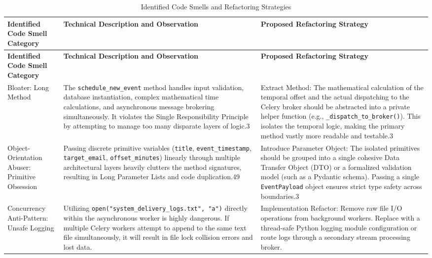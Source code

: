 \renewcommand{\arraystretch}{1.3}
\begin{longtable}{|>{\raggedright\arraybackslash}p{}|>{\raggedright\arraybackslash}p{}|>{\raggedright\arraybackslash}p{}|}
	\caption{Identified Code Smells and Refactoring Strategies}\label{tab:identified-code-smells-refactoring} \\
	\hline
	\textbf{Identified Code Smell Category} & \textbf{Technical Description and Observation} & \textbf{Proposed Refactoring Strategy} \\
	\hline
	\endfirsthead

	\hline
	\textbf{Identified Code Smell Category} & \textbf{Technical Description and Observation} & \textbf{Proposed Refactoring Strategy} \\
	\hline
	\endhead

	\hline
	\endfoot

	\hline
	\endlastfoot

	Bloater: Long Method &
	The \texttt{schedule\_new\_event} method handles input validation, database instantiation, complex mathematical time calculations, and asynchronous message brokering simultaneously. It violates the Single Responsibility Principle by attempting to manage too many disparate layers of logic.3 &
	Extract Method: The mathematical calculation of the temporal offset and the actual dispatching to the Celery broker should be abstracted into a private helper function (e.g., \texttt{\_dispatch\_to\_broker()}). This isolates the temporal logic, making the primary method vastly more readable and testable.3 \\
	\hline
	Object-Orientation Abuser: Primitive Obsession &
	Passing discrete primitive variables (\texttt{title}, \texttt{event\_timestamp}, \texttt{target\_email}, \texttt{offset\_minutes}) linearly through multiple architectural layers heavily clutters the method signatures, resulting in Long Parameter Lists and code duplication.49 &
	Introduce Parameter Object: The isolated primitives should be grouped into a single cohesive Data Transfer Object (DTO) or a formalized validation model (such as a Pydantic schema). Passing a single \texttt{EventPayload} object ensures strict type safety across boundaries.3 \\
	\hline
	Concurrency Anti-Pattern: Unsafe Logging &
	Utilizing \texttt{open("system\_delivery\_logs.txt", "a")} directly within the asynchronous worker is highly dangerous. If multiple Celery workers attempt to append to the same text file simultaneously, it will result in file lock collision errors and lost data. &
	Implementation Refactor: Remove raw file I/O operations from background workers. Replace with a thread-safe Python logging module configuration or route logs through a secondary stream processing broker. \\
	\hline
\end{longtable}

 